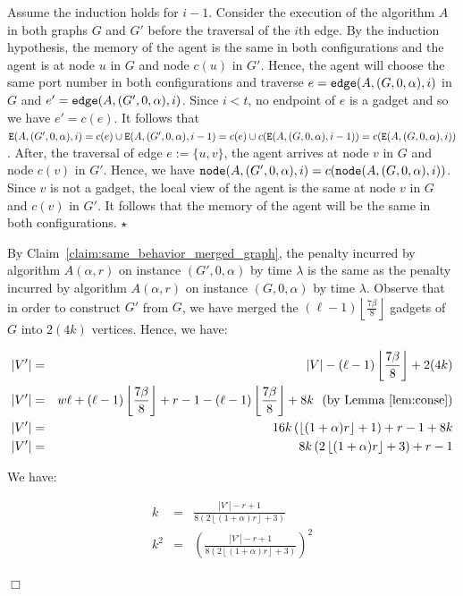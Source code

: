 \documentclass[11pt]{article}
\newcommand{\qed}{\hfill $\Box$ \bigbreak}
\newenvironment{proof}{\noindent {\bf Proof.}}{\qed}
\newenvironment{proofclaim}{\noindent{\bf Proof of the claim.}}{\hfill$\star$}
\begin{document}
{\begin{proof}
\begin{proofclaim}
Assume the induction holds for $i-1$. Consider the execution of the algorithm $A$ in both graphs $G$ and $G'$ before the traversal of the $i$th edge. By the induction hypothesis, the memory of the agent is the same in both configurations and the agent is at node $u$ in $G$ and node $c(u)$ in $G'$. Hence, the agent will choose the same port number in both configurations and traverse $e = {\tt edge}(A,(G,0,\alpha),i)$ in $G$ and $e'={\tt edge}(A,(G',0,\alpha),i)$. Since $i<t$, no endpoint of $e$ is a gadget and so we have $e'=c(e)$. It follows that ${\tt E}(A,(G',0,\alpha),i)= c(e) \cup {\tt E}(A,(G',0,\alpha),i-1) = c(e) \cup c({\tt E}(A,(G,0,\alpha),i-1)) = c({\tt E}(A,(G,0,\alpha),i))$. After, the traversal of edge $e:=\{u,v\}$, the agent arrives at node $v$ in $G$ and node $c(v)$ in $G'$. Hence, we have ${\tt node}(A,(G',0,\alpha),i)=c({\tt node}(A,(G,0,\alpha),i))$. Since $v$ is not a gadget, the local view of the agent is the same at node $v$ in $G$ and $c(v)$ in $G'$. It follows that the memory of the agent will be the same in both configurations. 
\end{proofclaim}

By Claim~\ref{claim:same_behavior_merged_graph}, the penalty incurred by algorithm $A(\alpha, r)$ on instance $(G', 0, \alpha)$ by time $\lambda$ is the same as the penalty incurred by algorithm $A(\alpha, r)$ on instance $(G, 0, \alpha)$ by time $\lambda$. Observe that in order to construct $G'$ from $G$, we have merged the $(\ell -1)\left\lfloor\frac{7\beta}{8}\right\rfloor$ gadgets of $G$ into $2(4k)$ vertices. Hence, we have:

\begin{eqnarray*}
|V'| & = & |V| - (\ell -1)\left\lfloor\frac{7\beta}{8}\right\rfloor + 2(4k)\\
|V'| & = & w\ell+ (\ell-1)\left\lfloor\frac{7\beta}{8}\right\rfloor+r-1 - (\ell -1)\left\lfloor\frac{7\beta}{8}\right\rfloor + 8k \mbox{~~(by Lemma~\ref{lem:conse})}\\
|V'| & = & 16k\left(\left\lfloor(1+\alpha)r\right\rfloor+1\right)+r-1  + 8k\\
|V'| & = & 8k\left(2\left\lfloor(1+\alpha)r\right\rfloor+3\right)+r-1
\end{eqnarray*}

We have:

\begin{eqnarray*}
k & = & \frac{|V'|-r+1}{8\left(2\left\lfloor(1+\alpha)r\right\rfloor+3\right)} \\
k^2 & = & \left(\frac{|V'|-r+1}{8\left(2\left\lfloor(1+\alpha)r\right\rfloor+3\right)}\right)^2
\end{eqnarray*}


\end{proof}}
\end{document}
